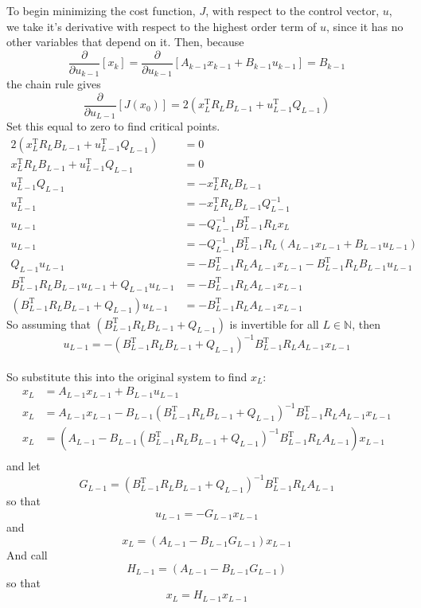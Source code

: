 \documentclass{article}
\begin{document}
To begin minimizing the cost function, $J$, with respect to the control vector, $u$, we take it's derivative with respect to the highest order term of $u$, since it has no other variables that depend on it. Then, because
\[ \frac{\partial}{\partial u_{k-1}} \left[ x_{k} \right] = \frac{\partial}{\partial u_{k-1}} \left[ A_{k-1}x_{k-1} + B_{k-1}u_{k-1} \right] = B_{k-1} \]
the chain rule gives
\[ \frac{\partial}{\partial u_{L-1}} \left[ J(x_{0}) \right] = 2 \left( x_{L}^{\text{T}}R_{L}B_{L-1} + u_{L-1}^{\text{T}}Q_{L-1} \right) \]
Set this equal to zero to find critical points.
\begin{align*}
2 \left( x_{L}^{\text{T}}R_{L}B_{L-1} + u_{L-1}^{\text{T}}Q_{L-1} \right) &= 0 \\
x_{L}^{\text{T}}R_{L}B_{L-1} + u_{L-1}^{\text{T}}Q_{L-1} &= 0 \\
u_{L-1}^{\text{T}}Q_{L-1} &= -x_{L}^{\text{T}}R_{L}B_{L-1} \\
u_{L-1}^{\text{T}} &= -x_{L}^{\text{T}}R_{L}B_{L-1}Q_{L-1}^{-1} \\
u_{L-1} &= -Q_{L-1}^{-1} B_{L-1}^{\text{T}} R_{L} x_{L} \\
u_{L-1} &= -Q_{L-1}^{-1} B_{L-1}^{\text{T}} R_{L} \left( A_{L-1}x_{L-1} + B_{L-1}u_{L-1} \right) \\
Q_{L-1}u_{L-1} &= -B_{L-1}^{\text{T}} R_{L} A_{L-1} x_{L-1} - B_{L-1}^{\text{T}} R_{L} B_{L-1} u_{L-1} \\
B_{L-1}^{\text{T}} R_{L} B_{L-1} u_{L-1} + Q_{L-1}u_{L-1} &= -B_{L-1}^{\text{T}} R_{L} A_{L-1} x_{L-1} \\
\left( B_{L-1}^{\text{T}} R_{L} B_{L-1} + Q_{L-1} \right) u_{L-1} &= -B_{L-1}^{\text{T}} R_{L} A_{L-1} x_{L-1}
\end{align*}
So assuming that $\left( B_{L-1}^{\text{T}} R_{L} B_{L-1} + Q_{L-1} \right)$ is invertible for all $L\in\mathbb{N}$, then
\[ \boxed{u_{L-1} = -\left( B_{L-1}^{\text{T}} R_{L} B_{L-1} + Q_{L-1} \right)^{-1} B_{L-1}^{\text{T}} R_{L} A_{L-1} x_{L-1}} \]

\paragraph{}
So substitute this into the original system to find $x_{L}$:
\begin{align*}
x_{L} &= A_{L-1}x_{L-1} + B_{L-1}u_{L-1} \\
x_{L} &= A_{L-1}x_{L-1} - B_{L-1} \left( B_{L-1}^{\text{T}} R_{L} B_{L-1} + Q_{L-1} \right)^{-1} B_{L-1}^{\text{T}} R_{L} A_{L-1} x_{L-1} \\
x_{L} &= \left( A_{L-1} - B_{L-1} \left( B_{L-1}^{\text{T}} R_{L} B_{L-1} + Q_{L-1} \right)^{-1} B_{L-1}^{\text{T}} R_{L} A_{L-1} \right) x_{L-1} \\
\end{align*}
and let
\[ \boxed{ G_{L-1} = \left( B_{L-1}^{\text{T}} R_{L} B_{L-1} + Q_{L-1} \right)^{-1} B_{L-1}^{\text{T}} R_{L} A_{L-1} } \]
so that 
\[ \boxed{ u_{L-1} = -G_{L-1} x_{L-1} } \]
and
\[ x_{L} = \left( A_{L-1} - B_{L-1} G_{L-1} \right) x_{L-1} \]
And call
\[ \boxed{ H_{L-1} = \left( A_{L-1} - B_{L-1} G_{L-1} \right) } \]
so that 
\[ \boxed{ x_{L} = H_{L-1} x_{L-1} } \]
\end{document}
